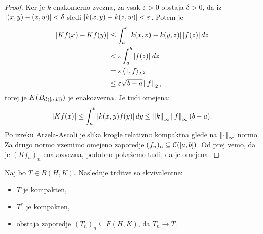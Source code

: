 \begin{proof}
  Ker je $k$ enakomerno zvezna, za vsak $\varepsilon > 0$ obstaja $\delta > 0$,
  da iz $\left| (x,y) - (z,w) \right| < \delta$ sledi $\left| k(x,y) - k(z,w) \right| <
  \varepsilon$.
  Potem je
  \begin{align*}
	\left| Kf(x) - Kf(y) \right|
	&\le \int_a^b \left| k(x,z) - k(y,z) \right| \left| f(z) \right| dz \\
	&< \varepsilon \int_a^b \left| f(z) \right| dz \\
	&= \varepsilon \left< 1, f \right>_{L^2} \\
	&\le \varepsilon \sqrt{b-a} \left\lVert f\right\rVert_2,
  \end{align*}
  torej je $K(B_{\mathcal{C}([a,b])})$ je enakozvezna.
  Je tudi omejena:
  \[
	\left| Kf(x) \right|
	\le \int_a^b \left| k(x,y) f(y) \right| dy
	\le \left\lVert k\right\rVert_\infty \left\lVert f\right\rVert_\infty (b-a).
  \]
  Po izreku Arzela-Ascoli je slika krogle relativno kompaktna glede na
  $\left\lVert\cdot\right\rVert_\infty$ normo.
  Za drugo normo vzemimo omejeno zaporedje $(f_n)_n \subseteq \mathcal{C}([a,b])$.
  Od prej vemo, da je $(Kf_n)_n$ enakozvezna, podobno pokažemo tudi, da je
  omejena.
\end{proof}


\begin{izrek}
  Naj bo $T \in B(H,K)$.
  Naslednje trditve so ekvivalentne:
  \begin{itemize}
  \item $T$ je kompakten,
  \item $T^*$ je kompakten,
  \item obstaja zaporedje $(T_n)_n \subseteq F(H,K)$, da $T_n \to T$.
  \end{itemize}
\end{izrek}

